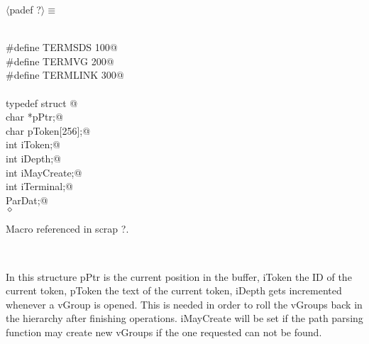 \documentclass[12pt]{article}
\begin{document}
\begin{flushleft} \small
\begin{minipage}{\linewidth} \label{scrap17}
$\langle$padef {\footnotesize ?}$\rangle\equiv$
\vspace{-1ex}
\begin{list}{}{} \item
\mbox{}\verb@@\\
\mbox{}\verb@#define TERMSDS 100@\\
\mbox{}\verb@#define TERMVG  200@\\
\mbox{}\verb@#define TERMLINK 300@\\
\mbox{}\verb@@\\
\mbox{}\verb@   typedef struct {@\\
\mbox{}\verb@                    char *pPtr;@\\
\mbox{}\verb@                    char pToken[256];@\\
\mbox{}\verb@                    int iToken;@\\
\mbox{}\verb@                    int iDepth;@\\
\mbox{}\verb@                    int iMayCreate;@\\
\mbox{}\verb@                    int iTerminal;@\\
\mbox{}\verb@                  } ParDat;@\\
\mbox{}\verb@@$\diamond$
\end{list}
\vspace{-1ex}
\footnotesize\addtolength{\baselineskip}{-1ex}
\begin{list}{}{\setlength{\itemsep}{-\parsep}\setlength{\itemindent}{-\leftmargin}}
\item Macro referenced in scrap ?.
\end{list}
\end{minipage}\\[4ex]
\end{flushleft}
In this structure pPtr is the current position in the buffer, iToken the ID
of the current token, pToken the text of the current token, iDepth gets
incremented whenever a vGroup is opened. This is needed in order to roll the
vGroups back in the hierarchy after finishing operations. iMayCreate will be
set if the path parsing function may create new vGroups if the one requested
can not be found.
\end{document}
